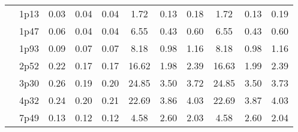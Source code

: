 \documentclass[12pt,A4paper]{article}
\begin{document}
\begin{table}[]
\begin{tabular}{lllllllllll}
\multicolumn{1}{|l|}{} & \multicolumn{1}{l|}{1p13} & \multicolumn{1}{c|}{0.03}        & \multicolumn{1}{c|}{0.04}         & \multicolumn{1}{c|}{0.04}        & \multicolumn{1}{c|}{1.72}         & \multicolumn{1}{c|}{0.13}        & \multicolumn{1}{c|}{0.18}        & \multicolumn{1}{c|}{1.72}        & \multicolumn{1}{c|}{0.13}        & \multicolumn{1}{c|}{0.19}         \\ \cline{2-11}
\multicolumn{1}{|l|}{} & \multicolumn{1}{l|}{1p47} & \multicolumn{1}{c|}{0.06}        & \multicolumn{1}{c|}{0.04}         & \multicolumn{1}{c|}{0.04}        & \multicolumn{1}{c|}{6.55}         & \multicolumn{1}{c|}{0.43}        & \multicolumn{1}{c|}{0.60}        & \multicolumn{1}{c|}{6.55}        & \multicolumn{1}{c|}{0.43}        & \multicolumn{1}{c|}{0.60}         \\ \cline{2-11}
\multicolumn{1}{|l|}{} & \multicolumn{1}{l|}{1p93} & \multicolumn{1}{c|}{0.09}        & \multicolumn{1}{c|}{0.07}         & \multicolumn{1}{c|}{0.07}        & \multicolumn{1}{c|}{8.18}         & \multicolumn{1}{c|}{0.98}        & \multicolumn{1}{c|}{1.16}        & \multicolumn{1}{c|}{8.18}        & \multicolumn{1}{c|}{0.98}        & \multicolumn{1}{c|}{1.16}         \\ \cline{2-11}
\multicolumn{1}{|l|}{} & \multicolumn{1}{l|}{2p52} & \multicolumn{1}{c|}{0.22}        & \multicolumn{1}{c|}{0.17}         & \multicolumn{1}{c|}{0.17}        & \multicolumn{1}{c|}{16.62}         & \multicolumn{1}{c|}{1.98}        & \multicolumn{1}{c|}{2.39}        & \multicolumn{1}{c|}{16.63}        & \multicolumn{1}{c|}{1.99}        & \multicolumn{1}{c|}{2.39}         \\ \cline{2-11}
\multicolumn{1}{|l|}{} & \multicolumn{1}{l|}{3p30} & \multicolumn{1}{c|}{0.26}        & \multicolumn{1}{c|}{0.19}         & \multicolumn{1}{c|}{0.20}        & \multicolumn{1}{c|}{24.85}         & \multicolumn{1}{c|}{3.50}        & \multicolumn{1}{c|}{3.72}        & \multicolumn{1}{c|}{24.85}        & \multicolumn{1}{c|}{3.50}        & \multicolumn{1}{c|}{3.73}         \\ \cline{2-11}
\multicolumn{1}{|l|}{} & \multicolumn{1}{l|}{4p32} & \multicolumn{1}{c|}{0.24}        & \multicolumn{1}{c|}{0.20}         & \multicolumn{1}{c|}{0.21}        & \multicolumn{1}{c|}{22.69}         & \multicolumn{1}{c|}{3.86}        & \multicolumn{1}{c|}{4.03}        & \multicolumn{1}{c|}{22.69}        & \multicolumn{1}{c|}{3.87}        & \multicolumn{1}{c|}{4.03}         \\ \cline{2-11}
\multicolumn{1}{|l|}{} & \multicolumn{1}{l|}{7p49} & \multicolumn{1}{c|}{0.13}        & \multicolumn{1}{c|}{0.12}         & \multicolumn{1}{c|}{0.12}        & \multicolumn{1}{c|}{4.58}         & \multicolumn{1}{c|}{2.60}        & \multicolumn{1}{c|}{2.03}        & \multicolumn{1}{c|}{4.58}        & \multicolumn{1}{c|}{2.60}        & \multicolumn{1}{c|}{2.04}         \\ \cline{2-11}

\end{tabular}
\end{table}
\end{document}
